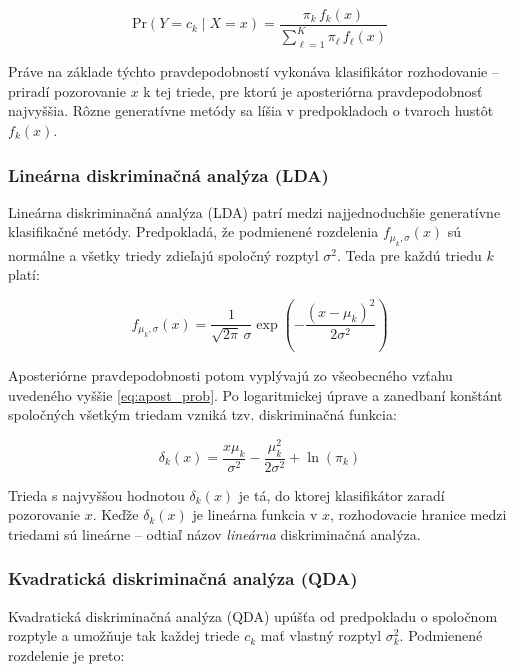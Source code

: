 \begin{equation}\label{eq:apost_prob}
\mathrm{Pr}(Y = c_k \mid X = x) = \frac{\pi_k \, f_k(x)}{\sum\limits_{\ell = 1}^{K} \pi_\ell \, f_\ell(x)}
\end{equation}

Práve na základe týchto pravdepodobností vykonáva klasifikátor rozhodovanie – priradí pozorovanie $x$ k tej triede, pre ktorú je aposteriórna pravdepodobnosť najvyššia. Rôzne generatívne metódy sa líšia v predpokladoch o tvaroch hustôt $f_k(x)$.

\subsubsection{Lineárna diskriminačná analýza (LDA)}
\label{subsubsec:lda}

Lineárna diskriminačná analýza (LDA) patrí medzi najjednoduchšie generatívne klasifikačné metódy. Predpokladá, že podmienené rozdelenia $f_{\mu_k,\sigma}(x)$ sú normálne a všetky triedy zdieľajú spoločný rozptyl $\sigma^2$. Teda pre každú triedu $k$ platí:

\begin{equation}
f_{\mu_k,\sigma}(x) = \frac{1}{\sqrt{2\pi} \, \sigma} \exp\left( -\frac{(x - \mu_k)^2}{2\sigma^2} \right)
\end{equation}

Aposteriórne pravdepodobnosti potom vyplývajú zo všeobecného vzťahu uvedeného vyššie \eqref{eq:apost_prob}. Po logaritmickej úprave a zanedbaní konštánt spoločných všetkým triedam vzniká tzv. diskriminačná funkcia:

\begin{equation}
\delta_k(x) = \frac{x \mu_k}{\sigma^2} - \frac{\mu_k^2}{2\sigma^2} + \ln(\pi_k)
\end{equation}

Trieda s najvyššou hodnotou $\delta_k(x)$ je tá, do ktorej klasifikátor zaradí pozorovanie $x$. Keďže $\delta_k(x)$ je lineárna funkcia v $x$, rozhodovacie hranice medzi triedami sú lineárne – odtiaľ názov \textit{lineárna} diskriminačná analýza.

\subsubsection{Kvadratická diskriminačná analýza (QDA)}
\label{subsubsec:qda}

Kvadratická diskriminačná analýza (QDA) upúšťa od predpokladu o spoločnom rozptyle a umožňuje tak každej triede $c_k$ mať vlastný rozptyl $\sigma_k^2$. Podmienené rozdelenie je preto:

